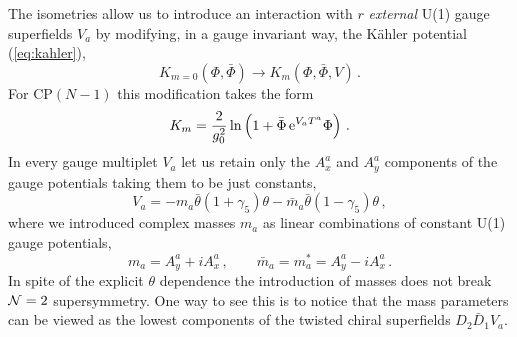 \documentclass[epsfig,12pt]{article}
\def\beq{\begin{equation}}
\def\beq{\begin{equation}}
\begin{document}
The isometries allow us  to introduce an interaction with $r$ {\em external} 
U(1) gauge 
superfields $V_{a}$ by modifying, in a gauge invariant way,  the K\"ahler potential (\ref{eq:kahler}),
\begin{equation}
\label{eq:mkahler}
K_{m=0}(\Phi, \bar\Phi)\to
K_{m}(\Phi, \bar\Phi,V)\,.
\end{equation}
For CP$(N\!-\!1)$ this modification takes the form
\begin{equation}
\label{eq:mkahlerp}
K_{m}=\frac{2}{g_{0}^{2}}\ln \left(1+\bar\Phi\,{\rm e}^{V_{a}T^{a}}\Phi\right)\,.
\end{equation}
In every gauge multiplet $V_{a}$ let us retain only the $A^{a}_{x}$ and $A^{a}_{y}$ 
components of the gauge potentials taking them to be just constants,
\beq
V_{a}=-m_{a}\bar \theta(1+\gamma_{5})\theta -\bar m_{a}\bar \theta(1-\gamma_{5})\theta\,,
\end{equation}
where we introduced complex masses  $m_{a}$ as linear combinations of 
constant U(1) gauge potentials,
\beq
m_{a}=A^{a}_{y}+iA^{a}_{x}\,,\qquad \bar m_{a}=m_{a}^{*}=A^{a}_{y}-iA^{a}_{x}\,.
\end{equation}
In spite  of the explicit $\theta$ dependence the introduction of masses does not 
break ${\cal N}=2$ supersymmetry.  One way to see this is to notice that the mass parameters 
can be viewed as the lowest components of the twisted chiral superfields
$D_{2}\bar D_{1}V_{a}$.
\end{document}
